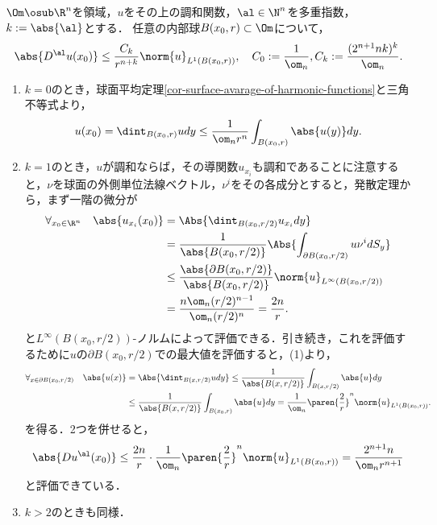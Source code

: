 \documentclass[uplatex,dvipdfmx]{jsreport}
\begin{document}
\begin{theorem}\label{thm-L1-evaluation-of-derivarive}
    $\Om\osub\R^n$を領域，$u$をその上の調和関数，$\al\in\N^n$を多重指数，$k:=\abs{\al}$とする．
    任意の内部球$B(x_0,r)\subset\Om$について，
    \[\abs{D^\al u(x_0)}\le\frac{C_k}{r^{n+k}}\norm{u}_{L^1(B(x_0,r))},\quad C_0:=\frac{1}{\om_n},C_k:=\frac{(2^{n+1}nk)^k}{\om_n}.\]
\end{theorem}
\begin{Proof}\mbox{}
    \begin{enumerate}
        \item $k=0$のとき，球面平均定理\ref{cor-surface-avarage-of-harmonic-functions}と三角不等式より，
        \[u(x_0)=\dint_{B(x_0,r)}udy\le\frac{1}{\om_nr^n}\int_{B(x_0,r)}\abs{u(y)}dy.\]
        \item $k=1$のとき，$u$が調和ならば，その導関数$u_{x_i}$も調和であることに注意すると，$\nu$を球面の外側単位法線ベクトル，$\nu^i$をその各成分とすると，発散定理から，まず一階の微分が
        \begin{align*}
            \forall_{x_0\in\R^n}\quad\abs{u_{x_i}(x_0)}&=\Abs{\dint_{B(x_0,r/2)}u_{x_i}dy}\\
            &=\frac{1}{\abs{B(x_0,r/2)}}\Abs{\int_{\partial B(x_0,r/2)}u\nu^idS_y}\\
            &\le\frac{\abs{\partial B(x_0,r/2)}}{\abs{B(x_0,r/2)}}\norm{u}_{L^\infty(B(x_0,r/2))}\\
            &=\frac{n\om_n(r/2)^{n-1}}{\om_n(r/2)^n}=\frac{2n}{r}.
        \end{align*}
        と$L^\infty(B(x_0,r/2))$-ノルムによって評価できる．引き続き，これを評価するために$u$の$\partial B(x_0,r/2)$での最大値を評価すると，(1)より，
        \begin{align*}
            \forall_{x\in\partial B(x_0,r/2)}\quad\abs{u(x)}&=\Abs{\dint_{B(x,r/2)}udy}\le\frac{1}{\abs{B(x,r/2)}}\int_{B(x,r/2)}\abs{u}dy\\
            &\le\frac{1}{\abs{B(x,r/2)}}\int_{B(x_0,r)}\abs{u}dy=\frac{1}{\om_n}\paren{\frac{2}{r}}^n\norm{u}_{L^1(B(x_0,r))}.
        \end{align*}
        を得る．2つを併せると，
        \[\abs{Du^\al(x_0)}\le\frac{2n}{r}\cdot\frac{1}{\om_n}\paren{\frac{2}{r}}^n\norm{u}_{L^1(B(x_0,r))}=\frac{2^{n+1}n}{\om_nr^{n+1}}\]
        と評価できている．
        \item $k>2$のときも同様．
    \end{enumerate}
\end{Proof}
\end{document}
